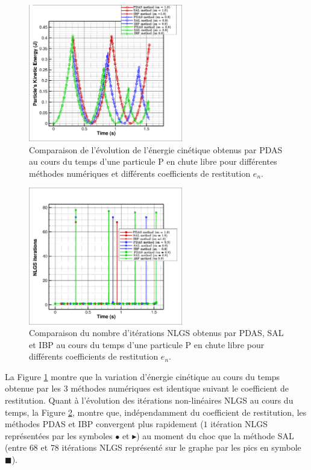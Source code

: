 \begin{figure}[!h]
  \centering
    \includegraphics[width=0.6\textwidth]{chapitres/chapitre_3/figures/ec_it_free_falling_particule_en=varied_AS(AM)_vs_LG_vs_BP.png}
    \caption{\centering Comparaison de l'évolution de l'énergie cinétique obtenus par PDAS au cours du temps d'une particule P en chute libre pour différentes méthodes numériques et différents coefficients de restitution $e_n$.}\label{fig39}
\end{figure}


\begin{figure}[!h]
  \centering
    \includegraphics[width=0.6\textwidth]{chapitres/chapitre_3/figures/nlgs_it_free_falling_particule_en=varied_AS(AM)_vs_LG_vs_BP.png}
    \caption{\centering Comparaison du nombre d'itérations NLGS obtenus par PDAS, SAL et IBP au cours du temps d'une particule P en chute libre pour différents coefficients de restitution $e_n$.}\label{fig310}
\end{figure}

La Figure \ref{fig39} montre que la variation d'énergie cinétique au cours du temps obtenue par les 3 méthodes numériques est identique suivant le coefficient de restitution. Quant à l'évolution des itérations non-linéaires NLGS au cours du temps, la Figure \ref{fig310}, montre que, indépendamment du coefficient de restitution, les méthodes PDAS et IBP convergent plus rapidement ($1$ itération NLGS représentées par les symboles $\bullet$ et $\blacktriangleright$) au moment du choc que la méthode SAL (entre $68$ et $78$ itérations NLGS représenté sur le graphe par les pics en symbole $\blacksquare$).

